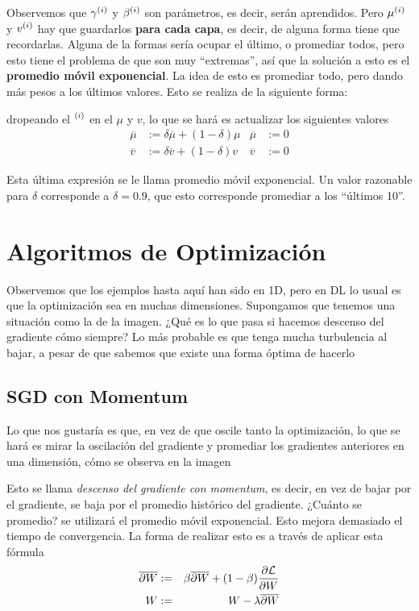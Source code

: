 Observemos que $\gamma^{(i)}$ y $\beta^{(i)}$ son parámetros, es decir, serán aprendidos. Pero $\mu^{(i)}$ y $v^{(i)}$ hay que guardarlos \textbf{para cada capa}, es decir, de alguna forma tiene que recordarlas. Alguna de la formas sería ocupar el último, o promediar todos, pero esto tiene el problema de que son muy ``extremas'', así que la solución a esto es el \textbf{promedio móvil exponencial}. La idea de esto es promediar todo, pero dando más pesos a los últimos valores. Esto se realiza de la siguiente forma: 

dropeando el $^{(i)}$ en el $\mu$ y $v$, lo que se hará es actualizar los siguientes valores
\begin{align}
\overline{\mu} &:= \delta \overline{\mu} + (1-\delta) \mu & \overline{\mu} &:= 0 \\
\overline{v} &:= \delta \overline{v} + (1-\delta) v & \overline{v} &:= 0
\end{align}

Esta última expresión se le llama promedio móvil exponencial. Un valor razonable para $\delta$ corresponde a $\delta=0.9$, que esto corresponde promediar a los ``últimos 10''.

\section{Algoritmos de Optimización}

Observemos que los ejemplos hasta aquí han sido en 1D, pero en DL lo usual es que la optimización sea en muchas dimensiones. Supongamos que tenemos una situación como la de la imagen. ¿Qué es lo que pasa si hacemos descenso del gradiente cómo siempre? Lo más probable es que tenga mucha turbulencia al bajar, a pesar de que sabemos que existe una forma óptima de hacerlo

\subsection{SGD con Momentum}

Lo que nos gustaría es que, en vez de que oscile tanto la optimización, lo que se hará es mirar la oscilación del gradiente y promediar los gradientes anteriores en una dimensión, cómo se observa en la imagen

Esto se llama \textit{descenso del gradiente con momentum}, es decir, en vez de bajar por el gradiente, se baja por el promedio histórico del gradiente. ¿Cuánto se promedio? se utilizará el promedio móvil exponencial. Esto mejora demasiado el tiempo de convergencia. La forma de realizar esto es a través de aplicar esta fórmula
\begin{eqnarray}
\overline{\partial W} &:=& \beta \overline{\partial W} + (1-\beta) \frac{\partial \mathcal{L}}{\partial W} \\
W &:=& W - \lambda \overline{\partial W}
\end{eqnarray}


